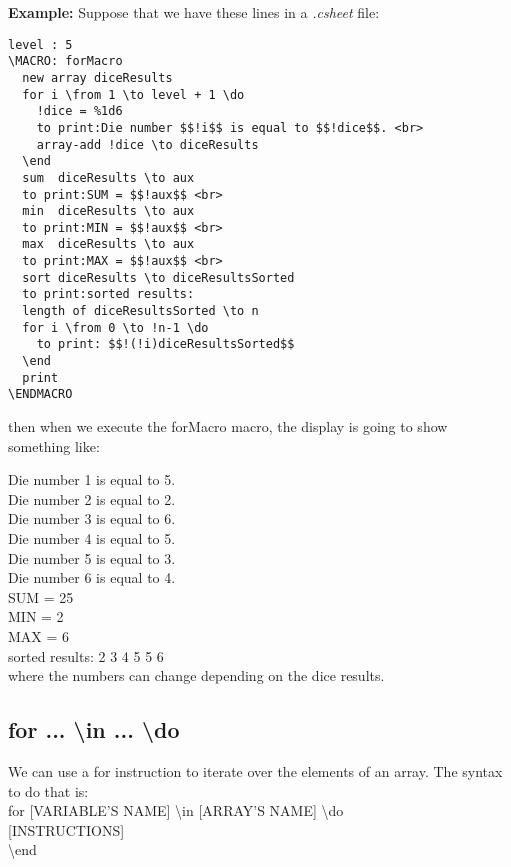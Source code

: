 \documentclass[11pt,a4paper,openright,oneside]{book}
\newenvironment{ex}
{
  \setlength{\parindent}{0cm}
  \large \textbf{Example:} \normalsize 
}
{}
\begin{document}
\begin{ex} Suppose that we have these lines in a \textit{.csheet} file:
  \begin{lstlisting}
level : 5
\MACRO: forMacro
  new array diceResults
  for i \from 1 \to level + 1 \do
    !dice = %1d6
    to print:Die number $$!i$$ is equal to $$!dice$$. <br>
    array-add !dice \to diceResults
  \end
  sum  diceResults \to aux
  to print:SUM = $$!aux$$ <br>
  min  diceResults \to aux
  to print:MIN = $$!aux$$ <br>
  max  diceResults \to aux
  to print:MAX = $$!aux$$ <br>
  sort diceResults \to diceResultsSorted
  to print:sorted results:
  length of diceResultsSorted \to n
  for i \from 0 \to !n-1 \do
    to print: $$!(!i)diceResultsSorted$$
  \end
  print
\ENDMACRO
  \end{lstlisting}
then when we execute the \textsf{forMacro} macro, the display is going to show something like:
\vspace{5px}

\textsf{Die number 1 is equal to 5.\\
Die number 2 is equal to 2.\\
Die number 3 is equal to 6.\\
Die number 4 is equal to 5.\\
Die number 5 is equal to 3.\\
Die number 6 is equal to 4.\\
SUM = 25\\
MIN = 2\\
MAX = 6\\
sorted results: 2 3 4 5 5 6} \\

where the numbers can change depending on the dice results.

\end{ex}

\subsection{\textsf{for ... \textbackslash in ... \textbackslash do}}

We can use a \textsf{for} instruction to iterate over the elements of an array. The syntax to do that is: \vspace{5px} \\
\textsf{for \textsc{\scriptsize[VARIABLE'S NAME]} \textbackslash in \textsc{\scriptsize[ARRAY'S NAME]} \textbackslash do} \\
\textsc{\scriptsize[INSTRUCTIONS]} \\
\textsf{\textbackslash end} \\
\end{document}
